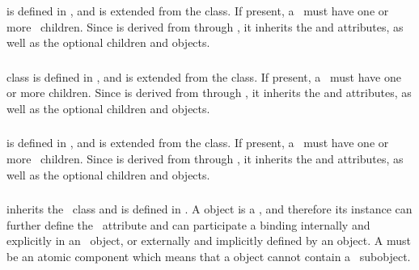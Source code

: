  is defined in , and is extended from the  class. If present, a \listOfSpeciesTypeInstances\ must have one or more \SpeciesTypeInstance\ children.  Since  is derived from  through , it inherits the  and  attributes, as well as the optional children  and  objects. 

\subsubsection{}
\label{def:ListOfInSpeciesTypeBonds}

 class is defined in , and is extended from the  class. If present, a \listOfInSpeciesTypeBonds\ must have one or more \InSpeciesTypeBond children.  Since  is derived from  through , it inherits the  and  attributes, as well as the optional children  and  objects. 

\subsubsection{}
\label{def:ListOfSpeciesTypeComponentIndexes}

 is defined in , and is extended from the  class. If present, a \listOfSpeciesTypeComponentIndexes\ must have one or more \SpeciesTypeComponentIndex\ children.  Since  is derived from  through , it inherits the  and  attributes, as well as the optional children  and  objects. 


\subsubsection{}
\label{def:BindingSiteSpeciesType}

 inherits the \SpeciesType\ class and is defined in . A  object is a , and therefore its instance can further define the \bindingStatusAtt\ attribute and can participate a binding internally and explicitly in an \InSpeciesTypeBond\ object, or externally and implicitly defined by an \OutwardBindingSite object. A  must be an atomic component which means that a  object cannot contain a \ListOfSpeciesTypeInstances\ subobject.

